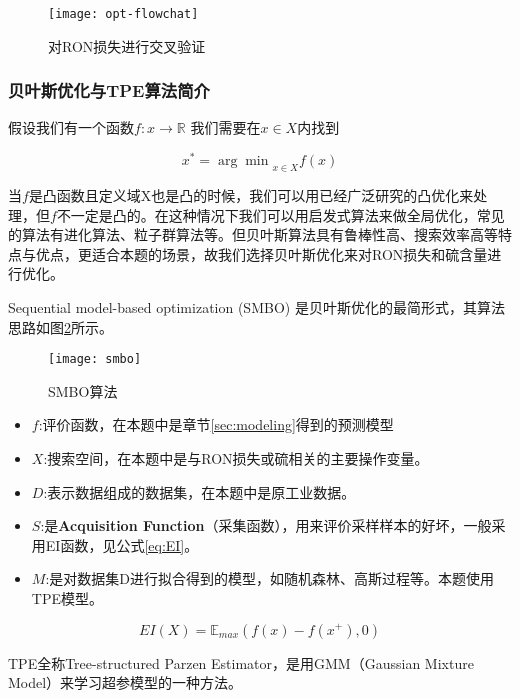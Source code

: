 \documentclass[bwprint]{gmcmthesis}
\begin{document}
\begin{figure}[htb]
	\centering
	\texttt{[image: opt-flowchat]}
	\caption{对RON损失进行交叉验证}
	\label{img:opt-flowchat}
\end{figure}




\FloatBarrier
\subsubsection{贝叶斯优化与TPE算法简介}

假设我们有一个函数$f:x\rightarrow \mathbb{R}$ 我们需要在$x\in X$内找到

\begin{equation}\label{eq:optimation}
	x^*={\arg\min}_{x\in X}f(x)
\end{equation}

当$f$是凸函数且定义域X也是凸的时候，我们可以用已经广泛研究的凸优化来处理，但$f$不一定是凸的。在这种情况下我们可以用启发式算法来做全局优化，常见的算法有进化算法、粒子群算法等。但贝叶斯算法具有鲁棒性高、搜索效率高等特点与优点，更适合本题的场景，故我们选择贝叶斯优化来对RON损失和硫含量进行优化。

Sequential model-based optimization (SMBO) 是贝叶斯优化的最简形式，其算法思路如图\ref{img:smbo}所示。

\begin{figure}[htb]
	\centering
	\texttt{[image: smbo]}
	\caption{SMBO算法}
	\label{img:smbo}
\end{figure}

\begin{itemize}
	\item $f$:评价函数，在本题中是章节\ref{sec:modeling}得到的预测模型
	\item $X$:搜索空间，在本题中是与RON损失或硫相关的主要操作变量。
	\item $D$:表示数据组成的数据集，在本题中是原工业数据。
	\item $S$:是\textbf{Acquisition Function}（采集函数），用来评价采样样本的好坏，一般采用EI函数，见公式\eqref{eq:EI}。
	\item $\mathit{M}$:是对数据集D进行拟合得到的模型，如随机森林、高斯过程等。本题使用TPE模型。
\end{itemize}

\begin{equation}\label{eq:EI}
	EI(X)=\mathbb{E}_{max}(f(x)-f(x^+), 0)
\end{equation}

TPE全称Tree-structured Parzen Estimator，是用GMM（Gaussian Mixture Model）来学习超参模型的一种方法。
\end{document}
